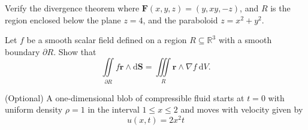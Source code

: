 \documentclass[answers]{exam}
\begin{document}
\begin{questions}
\question%
Verify the divergence theorem where $\mathbf{F}(x, y, z)=(y, x y,-z)$, and $R$ is the region enclosed below the plane $z=4$, and the paraboloid $z=x^{2}+y^{2}$.



\question%
Let $f$ be a smooth scalar field defined on a region $R \subseteq \mathbb{R}^{3}$ with a smooth boundary $\partial R$. Show that \[
	\iint\limits_{\partial R} f \mathbf{r} \wedge \mathrm{d} \mathbf{S}=\iiint\limits_{R} \mathbf{r} \wedge \nabla f \mathrm{~d} V.
\]



\question%
(Optional) A one-dimensional blob of compressible fluid starts at $t=0$ with uniform density $\rho=1$ in the interval $1 \leqslant x \leqslant 2$ and moves with velocity given by \[
	u(x, t)=2 x^{2} t
\]

\end{questions}
\end{document}
